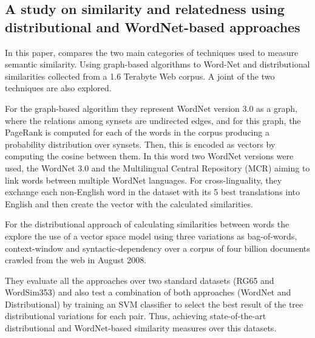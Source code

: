 \subsection{A study on similarity and relatedness using distributional and WordNet-based approaches}


In this paper,  compares the two main categories of techniques used to measure semantic similarity. Using graph-based algorithms to Word-Net and distributional similarities collected from a 1.6 Terabyte Web corpus. A joint of the two techniques are also explored.

For the graph-based algorithm they represent WordNet version 3.0 as a graph, where the relations among synsets are undirected edges, and for this graph, the PageRank is computed for each of the words in the corpus producing a probability distribution over synsets. Then, this is encoded as vectors by computing the cosine between them. In this word two WordNet versions were used, the WordNet 3.0 and the Multilingual Central Repository (MCR) aiming to link words between multiple WordNet languages. For cross-linguality, they exchange each non-English word in the dataset with its 5 best translations into English and then create the vector with the calculated similarities.

For the distributional approach of calculating similarities between words the explore the use of a vector space model using three variations as bag-of-words, context-window and syntactic-dependency over a corpus of four billion documents crawled from the web in August 2008.

They evaluate all the approaches over two standard datasets (RG65 and WordSim353) and also test a combination of both approaches (WordNet and Distributional) by training an SVM classifier to select the best result of the tree distributional variations for each pair. Thus, achieving state-of-the-art distributional and WordNet-based similarity measures over this datasets.